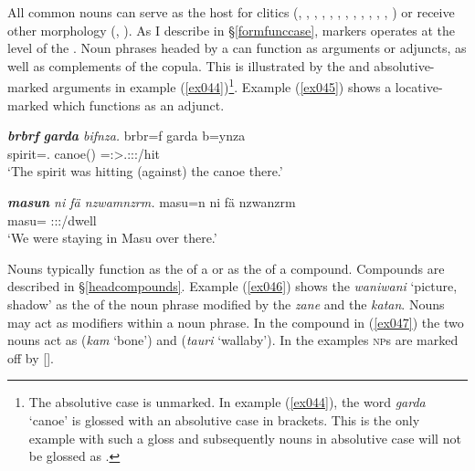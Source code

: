 All common nouns can serve as the host for  clitics (, , , , , , , , , , , , ) or receive other  morphology (, ). As I describe in \S{}\ref{formfunccase},  markers operates at the level of the . Noun phrases headed by a  can function as arguments or adjuncts, as well as complements of the copula. This is illustrated by the  and absolutive-marked arguments in example (\ref{ex044})\footnote{The absolutive case is unmarked. In example (\ref{ex044}), the word \emph{garda} `canoe' is glossed with an absolutive case in brackets. This is the only example with such a gloss and subsequently nouns in absolutive case will not be glossed as \Abs.}. Example (\ref{ex045}) shows a locative-marked  which functions as an adjunct.

\begin{exe}
	\ex \emph{\textbf{brbrf} \textbf{garda} bifnza.}
	\gll brbr=f garda b=ynza\\
	spirit=\Erg.\Sg{} canoe(\Abs{}) \Med=\Stsg:\Sbj>\Tsg.\Masc:\Obj:\Pst:\Ipfv/hit\\
	\trans `The spirit was hitting (against) the canoe there.' 
	\label{ex044}
\end{exe}
\begin{exe}
	\ex \emph{\textbf{masun} ni fä nzwamnzrm.}
	\gll masu=n ni fä nzwanzrm\\
	masu=\Loc{} \Fnsg{} \Dist{} \Fpl:\Sbj:\Pst:\Dur/dwell\\
	\trans `We were staying in Masu over there.' 
	\label{ex045}
\end{exe}

Nouns typically function as the  of a  or as the  of a  compound. Compounds are described in \S{}\ref{headcompounds}. Example (\ref{ex046}) shows the  \emph{waniwani} `picture, shadow' as the  of the noun phrase modified by the  \emph{zane} and the  \emph{katan}. Nouns may act as modifiers within a noun phrase. In the  compound in (\ref{ex047}) the two nouns act as  (\emph{kam} `bone') and  (\emph{tauri} `wallaby'). In the examples \textsc{np}s are marked off by [].

